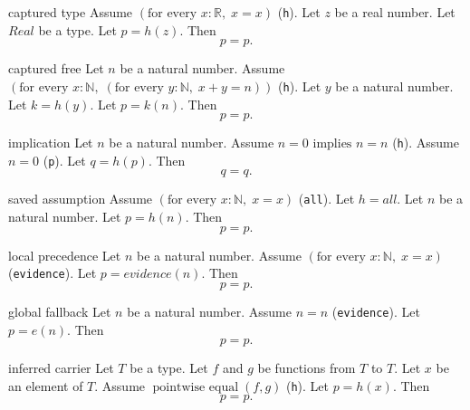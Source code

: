 \begin{cleanresult}{captured type}
Assume $\left(\text{for every }x : \mathbb{R},\; x = x\right)$ (\texttt{h}).
Let $z$ be a real number.
Let $\mathit{Real}$ be a type.
Let $p = h(z)$.
Then \[p = p.\]
\end{cleanresult}

\begin{cleanresult}{captured free}
Let $n$ be a natural number.
Assume $\left(\text{for every }x : \mathbb{N},\; \left(\text{for every }y : \mathbb{N},\; x + y = n\right)\right)$ (\texttt{h}).
Let $y$ be a natural number.
Let $k = h(y)$.
Let $p = k(n)$.
Then \[p = p.\]
\end{cleanresult}

\begin{cleanresult}{implication}
Let $n$ be a natural number.
Assume $n = 0 \text{ implies } n = n$ (\texttt{h}).
Assume $n = 0$ (\texttt{p}).
Let $q = h(p)$.
Then \[q = q.\]
\end{cleanresult}

\begin{cleanresult}{saved assumption}
Assume $\left(\text{for every }x : \mathbb{N},\; x = x\right)$ (\texttt{all}).
Let $h = \mathit{all}$.
Let $n$ be a natural number.
Let $p = h(n)$.
Then \[p = p.\]
\end{cleanresult}

\begin{cleanresult}{local precedence}
Let $n$ be a natural number.
Assume $\left(\text{for every }x : \mathbb{N},\; x = x\right)$ (\texttt{evidence}).
Let $p = \mathit{evidence}(n)$.
Then \[p = p.\]
\end{cleanresult}

\begin{cleanresult}{global fallback}
Let $n$ be a natural number.
Assume $n = n$ (\texttt{evidence}).
Let $p = e(n)$.
Then \[p = p.\]
\end{cleanresult}

\begin{cleanresult}{inferred carrier}
Let $T$ be a type.
Let $f$ and $g$ be functions from $T$ to $T$.
Let $x$ be an element of $T$.
Assume $\operatorname{pointwise\ equal}(f, g)$ (\texttt{h}).
Let $p = h(x)$.
Then \[p = p.\]
\end{cleanresult}

